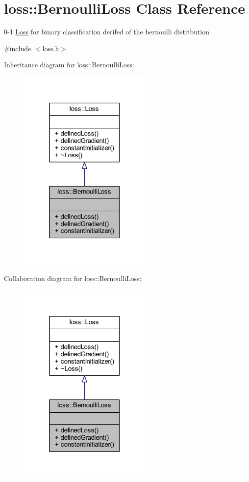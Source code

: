 \hypertarget{classloss_1_1_bernoulli_loss}{}\section{loss\+:\+:Bernoulli\+Loss Class Reference}
\label{classloss_1_1_bernoulli_loss}


0-\/1 \mbox{\hyperlink{classloss_1_1_loss}{Loss}} for binary classification derifed of the bernoulli distribution  




{\ttfamily \#include $<$loss.\+h$>$}



Inheritance diagram for loss\+:\+:Bernoulli\+Loss\+:\nopagebreak
\begin{figure}[H]
\begin{center}
\leavevmode
\includegraphics[width=187pt]{classloss_1_1_bernoulli_loss__inherit__graph}
\end{center}
\end{figure}


Collaboration diagram for loss\+:\+:Bernoulli\+Loss\+:\nopagebreak
\begin{figure}[H]
\begin{center}
\leavevmode
\includegraphics[width=187pt]{classloss_1_1_bernoulli_loss__coll__graph}
\end{center}
\end{figure}
